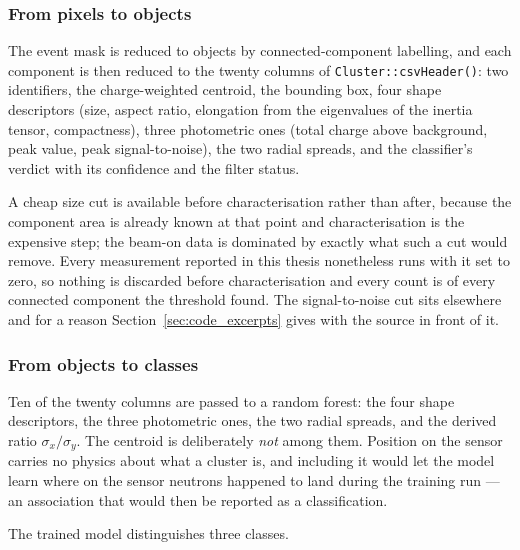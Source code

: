 \documentclass[a4paper,headsepline,oneside,11pt]{scrartcl}
\begin{document}
\subsubsection{From pixels to objects}

The event mask is reduced to objects by connected-component labelling, and each
component is then reduced to the twenty columns of
\texttt{Cluster::\allowbreak csvHeader()}: two identifiers, the charge-weighted centroid, the
bounding box, four shape descriptors (size, aspect ratio, elongation from the
eigenvalues of the inertia tensor, compactness), three photometric ones (total
charge above background, peak value, peak signal-to-noise), the two radial
spreads, and the classifier's verdict with its confidence and the filter status.

A cheap size cut is available before characterisation rather than after, because
the component area is already known at that point and characterisation is the
expensive step; the beam-on data is dominated by exactly what such a cut would
remove. Every measurement reported in this thesis nonetheless runs with it set
to zero, so nothing is discarded before characterisation and every count is of
every connected component the threshold found.
The signal-to-noise cut sits elsewhere and for a reason
Section~\ref{sec:code_excerpts} gives with the source in front of it.

\subsubsection{From objects to classes}

Ten of the twenty columns are passed to a random forest: the four shape
descriptors, the three photometric ones, the two radial spreads, and the derived
ratio $\sigma_x/\sigma_y$. The centroid is deliberately \emph{not} among them.
Position on the sensor carries no physics about what a cluster is, and including
it would let the model learn where on the sensor neutrons happened to land during
the training run --- an association that would then be reported as a
classification.

The trained model distinguishes three classes.
\end{document}
